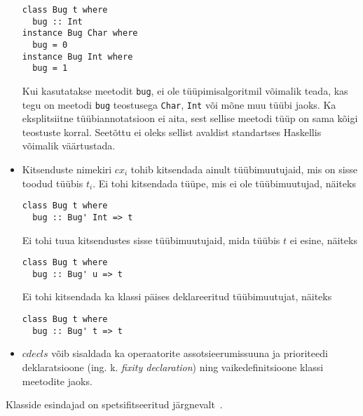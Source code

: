 \documentclass[12pt]{article}
\begin{document}
\begin{itemize}
            \begin{verbatim}class Bug t where
  bug :: Int
instance Bug Char where
  bug = 0
instance Bug Int where
  bug = 1\end{verbatim}

            Kui kasutatakse meetodit \verb!bug!, ei ole tüüpimisalgoritmil võimalik teada, kas tegu on meetodi \verb!bug! teostusega \verb!Char!, \verb!Int! või mõne muu tüübi jaoks. Ka eksplitsiitne tüübiannotatsioon ei aita, sest sellise meetodi tüüp on sama kõigi teostuste korral. Seetõttu ei oleks sellist avaldist standartses Haskellis võimalik väärtustada.
          \item
            Kitsenduste nimekiri $cx_i$ tohib kitsendada ainult tüübimuutujaid, mis on sisse toodud tüübis $t_i$. Ei tohi kitsendada tüüpe, mis ei ole tüübimuutujad, näiteks

            \begin{verbatim}class Bug t where
  bug :: Bug' Int => t\end{verbatim}

            Ei tohi tuua kitsendustes sisse tüübimuutujaid, mida tüübis $t$ ei esine, näiteks

            \begin{verbatim}class Bug t where
  bug :: Bug' u => t\end{verbatim}

            Ei tohi kitsendada ka klassi päises deklareeritud tüübimuutujat, näiteks

            \begin{verbatim}class Bug t where
  bug :: Bug' t => t\end{verbatim}
          \item
            $cdecls$ võib sisaldada ka operaatorite assotsieerumissuuna ja prioriteedi deklaratsioone (ing. k. \textit{fixity declaration}) ning vaikedefinitsioone klassi meetodite jaoks.
        \end{itemize}

        Klasside esindajad on spetsifitseeritud järgnevalt~\cite{Has}.
\end{document}
